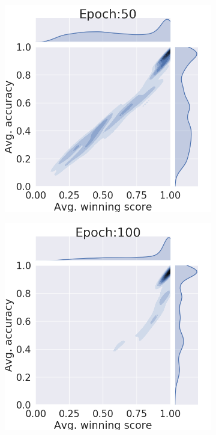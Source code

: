 \documentclass{article}
\begin{document}
\begin{figure}[htb]
\begin{subfigure}[b]{0.19\textwidth}
         \noindent\includegraphics[width=\textwidth]{images/joint_plot/no_mixup/50.png}
         \caption{}
     \end{subfigure}
     \hfill
     \begin{subfigure}[b]{0.19\textwidth}
         \centering
         \noindent\includegraphics[width=\textwidth]{images/joint_plot/no_mixup/100.png}

\end{subfigure}
\end{figure}
\end{document}
